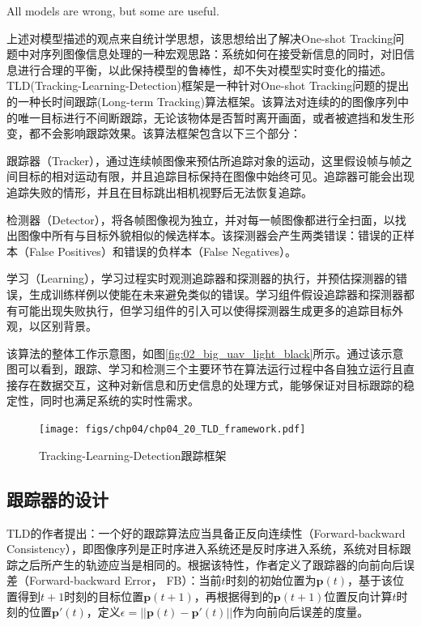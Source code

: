 \begin{center}
All models are wrong, but some are useful.
\end{center} 



上述对模型描述的观点来自统计学思想，该思想给出了解决One-shot Tracking问题中对序列图像信息处理的一种宏观思路：系统如何在接受新信息的同时，对旧信息进行合理的平衡，以此保持模型的鲁棒性，却不失对模型实时变化的描述。TLD(Tracking-Learning-Detection)\cite{kalal2012tracking}框架是一种针对One-shot Tracking问题的提出的一种长时间跟踪(Long-term Tracking)算法框架。该算法对连续的的图像序列中的唯一目标进行不间断跟踪，无论该物体是否暂时离开画面，或者被遮挡和发生形变，都不会影响跟踪效果。该算法框架包含以下三个部分：
\begin{compactenum}
	\item 跟踪器（Tracker），通过连续帧图像来预估所追踪对象的运动，这里假设帧与帧之间目标的相对运动有限，并且追踪目标保持在图像中始终可见。追踪器可能会出现追踪失败的情形，并且在目标跳出相机视野后无法恢复追踪。
	\item 检测器（Detector），将各帧图像视为独立，并对每一帧图像都进行全扫面，以找出图像中所有与目标外貌相似的候选样本。该探测器会产生两类错误：错误的正样本（False Positives）和错误的负样本（False Negatives）。
	\item 学习（Learning），学习过程实时观测追踪器和探测器的执行，并预估探测器的错误，生成训练样例以使能在未来避免类似的错误。学习组件假设追踪器和探测器都有可能出现失败执行，但学习组件的引入可以使得探测器生成更多的追踪目标外观，以区别背景。
\end{compactenum}

该算法的整体工作示意图，如图\ref{fig:02_big_uav_light_black}所示\cite{kalal2012tracking}。通过该示意图可以看到，跟踪、学习和检测三个主要环节在算法运行过程中各自独立运行且直接存在数据交互，这种对新信息和历史信息的处理方式，能够保证对目标跟踪的稳定性，同时也满足系统的实时性需求。

\begin{figure}[ht]   
	\centering
	\texttt{[image: figs/chp04/chp04\_20\_TLD\_framework.pdf]}
	\caption{Tracking-Learning-Detection跟踪框架}
	\label{fig:chp04_20_TLD_framework}
\end{figure}


\subsection{跟踪器的设计}
TLD的作者提出：一个好的跟踪算法应当具备正反向连续性（Forward-backward Consistency）\cite{kalal2010forward}，即图像序列是正时序进入系统还是反时序进入系统，系统对目标跟踪之后所产生的轨迹应当是相同的。根据该特性，作者定义了跟踪器的向前向后误差（Forward-backward Error， FB）：当前$t$时刻的初始位置为$\mathbf{p}(t)$，基于该位置得到$t+1$时刻的目标位置$\mathbf{p}(t+1)$，再根据得到的$\mathbf{p}(t+1)$位置反向计算$t$时刻的位置$ \mathbf{p}'(t)$，定义$\epsilon =||\mathbf{p}(t)-\mathbf{p}'(t)||$作为向前向后误差的度量。

